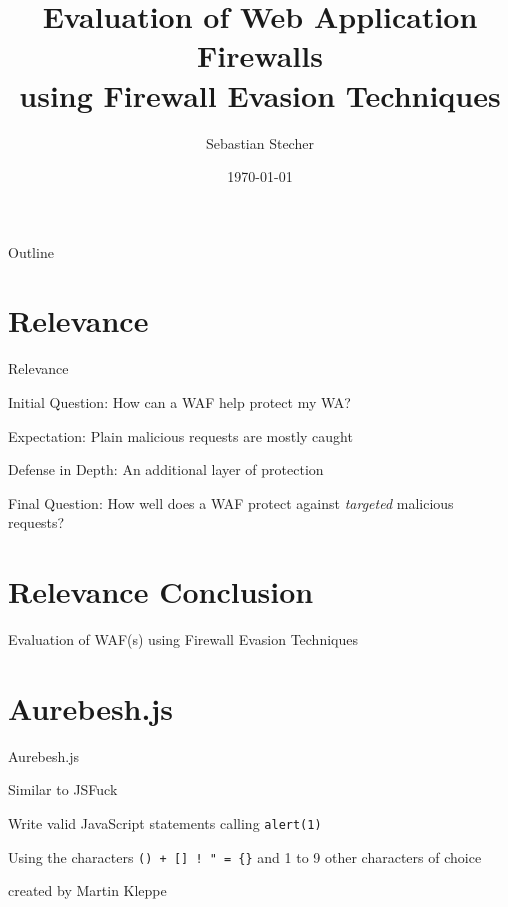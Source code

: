 \documentclass[aspectratio=169]{beamer}
\title[Evaluation of Web Application Firewalls using Firewall Evasion Techniques]{Evaluation of Web Application Firewalls \\ using Firewall Evasion Techniques}
\author{Sebastian Stecher}
\institute{HDBW Hochschule der Bayerischen Wirtschaft}
\date{\today}
\newcommand{\supertext}[1]{\fontsize{30}{40}\selectfont #1}
\begin{document}
\maketitle



\begin{frame}{Outline}
	\tableofcontents
\end{frame}

\section{Relevance}
\begin{frame}{Relevance}
	\begin{vfilleditems}
		\item<2-> Initial Question: How can a WAF help protect my WA?
		\item<3-> Expectation: Plain malicious requests are mostly caught
		\item<4-> Defense in Depth: An additional layer of protection
		\item<5-> Final Question: How well does a WAF protect against \textit{targeted} malicious requests?
	\end{vfilleditems}
\end{frame}

\section*{Relevance Conclusion}
\begin{frame}
	\centering
	\vfill
	\supertext{Evaluation of WAF(s) using Firewall Evasion Techniques}
	\vfill
\end{frame}

\section{Aurebesh.js}

\begin{frame}[fragile]{Aurebesh.js}
	\begin{vfilleditems}
		\item<2-> Similar to JSFuck \cite{mk/jsfuck}
		\item<3-> Write valid JavaScript statements calling \verb|alert(1)|
		\item<4-> Using the characters \verb|() + [] ! " = {}| and 1 to 9 other characters of choice
		\item<5-> created by Martin Kleppe \cite{mk/aurebesh}
	\end{vfilleditems}
\end{frame}
\end{document}
